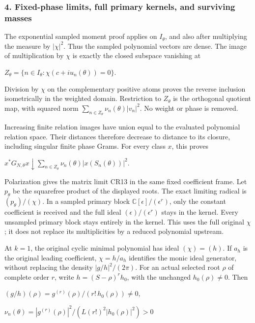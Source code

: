 \subsubsection{4. Fixed-phase limits, full primary kernels, and surviving masses}\label{fixed-phase-limits-full-primary-kernels-and-surviving-masses}

The exponential sampled moment proof applies on \(I_\theta\), and also after multiplying the measure by \(|\chi|^2\). Thus the sampled polynomial vectors are dense. The image of multiplication by \(\chi\) is exactly the closed subspace vanishing at

\(Z_\theta=\{n\in I_\theta:\chi(c+iu_n(\theta))=0\}\).

Division by \(\chi\) on the complementary positive atoms proves the reverse inclusion isometrically in the weighted domain. Restriction to \(Z_\theta\) is the orthogonal quotient map, with squared norm \(\sum_{n\in Z_\theta}\nu_n(\theta)|v_n|^2\). No weight or phase is removed.

Increasing finite relation images have union equal to the evaluated polynomial relation space. Their distances therefore decrease to distance to its closure, including singular finite phase Grams. For every class \(x\), this proves

\(x^*G_{N,\theta}x\downarrow\sum_{n\in Z_\theta}\nu_n(\theta)|x(S_n(\theta))|^2\).

Polarization gives the matrix limit CR13 in the same fixed coefficient frame. Let \(p_\theta\) be the squarefree product of the displayed roots. The exact limiting radical is \((p_\theta)/(\chi)\). In a sampled primary block \(\mathbb C[\epsilon]/(\epsilon^r)\), only the constant coefficient is received and the full ideal \((\epsilon)/(\epsilon^r)\) stays in the kernel. Every unsampled primary block stays entirely in the kernel. This uses the full original \(\chi\); it does not replace its multiplicities by a reduced polynomial upstream.

At \(k=1\), the original cyclic minimal polynomial has ideal \((\chi)=(h)\). If \(a_h\) is the original leading coefficient, \(\chi=h/a_h\) identifies the monic ideal generator, without replacing the density \(|g/h|^2/(2\pi)\). For an actual selected root \(\rho\) of complete order \(r\), write \(h=(S-\rho)^rh_0\), with the unchanged \(h_0(\rho)\ne0\). Then

\((g/h)(\rho)=g^{(r)}(\rho)/(r!\,h_0(\rho))\ne0\),

\(\nu_n(\theta)=|g^{(r)}(\rho)|^2/(L(r!)^2|h_0(\rho)|^2)>0\)


